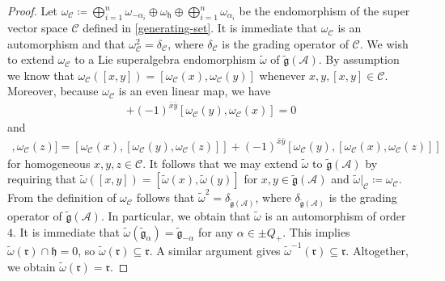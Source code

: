 \documentclass[12pt, a4paper, reqno]{amsart}
\def\AA{\mathcal{A}}
\def\g{\mathfrak{g}}
\theoremstyle{definition}
\theoremstyle{definition}
\theoremstyle{definition}
\numberwithin{theorem}{section}
\numberwithin{lemma}{section}
\numberwithin{remark}{section}
\numberwithin{definition}{section}
\numberwithin{corollary}{section}
\numberwithin{proposition}{section}
\numberwithin{example}{section}
\begin{document}
	\begin{proof}
		Let \(\omega_{\mathcal{C}} \coloneq \bigoplus_{i=1}^n \omega_{-\alpha_i} \oplus \omega_{\mathfrak{h}} \oplus \bigoplus_{i=1}^n \omega_{\alpha_i}\) be the endomorphism of the super vector space \(\mathcal{C}\) defined in \eqref{generating-set}. It is immediate that \(\omega_{\mathcal{C}}\) is an automorphism and that \(\omega_{\mathcal{C}}^2 = \delta_{\mathcal{C}}\), where \(\delta_{\mathcal{C}}\) is the grading operator of \(\mathcal{C}\). We wish to extend \(\omega_{\mathcal{C}}\) to a Lie superalgebra endomorphism \(\tilde{\omega}\) of \(\tilde{\mathfrak{g}}(\mathcal{A})\). By assumption we know that \(\omega_{\mathcal{C}}([x,y]) = [\omega_{\mathcal{C}}(x),\omega_{\mathcal{C}}(y)]\) whenever \(x,y,[x,y] \in \mathcal{C}\). Moreover, because \(\omega_\mathcal{C}\) is an even linear map, we have
		\begin{align*}
			[\omega_{\mathcal{C}}(x),\omega_{\mathcal{C}}(y)] + (-1)^{\bar{x}\bar{y}}[\omega_{\mathcal{C}}(y),\omega_{\mathcal{C}}(x)] = 0
		\end{align*} 
		and
		\begin{align*}
			[[\omega_{\mathcal{C}}(x),\omega_{\mathcal{C}}(y)],\omega_{\mathcal{C}}(z)] = [\omega_{\mathcal{C}}(x),[\omega_{\mathcal{C}}(y),\omega_{\mathcal{C}}(z)]] + (-1)^{\bar{x}\bar{y}} [\omega_{\mathcal{C}}(y),[\omega_{\mathcal{C}}(x),\omega_{\mathcal{C}}(z)]]
		\end{align*}
		for homogeneous \(x,y,z \in \mathcal{C}\). It follows that we may extend \(\tilde{\omega}\) to $\tilde{\g}(\AA)$ by requiring that \(\tilde{\omega}([x,y]) = [\tilde{\omega}(x),\tilde{\omega}(y)]\) for \(x,y \in \tilde{\mathfrak{g}}(\mathcal{A})\) and \(\tilde{\omega}|_{\mathcal{C}} \coloneq \omega_{\mathcal{C}}\). From the definition of \(\omega_{\mathcal{C}}\) follows that \(\tilde{\omega}^2 = \delta_{\tilde{\mathfrak{g}}(\mathcal{A})}\), where \(\delta_{\tilde{\mathfrak{g}}(\mathcal{A})}\) is the grading operator of \(\tilde{\mathfrak{g}}(\mathcal{A})\). In particular, we obtain that \(\tilde{\omega}\) is an automorphism of order \(4\). It is immediate that \(\tilde{\omega}(\tilde{\mathfrak{g}}_{\alpha}) = \tilde{\mathfrak{g}}_{-\alpha}\) for any \(\alpha \in \pm Q_+\). This implies \(\tilde{\omega}(\mathfrak{r})\cap \mathfrak{h} = 0\), so \(\tilde{\omega}(\mathfrak{r}) \subseteq \mathfrak{r}\). A similar argument gives \(\tilde{\omega}^{-1}(\mathfrak{r}) \subseteq \mathfrak{r}\). Altogether, we obtain \(\tilde{\omega}(\mathfrak{r}) = \mathfrak{r}\).
	\end{proof}
	
\end{document}
